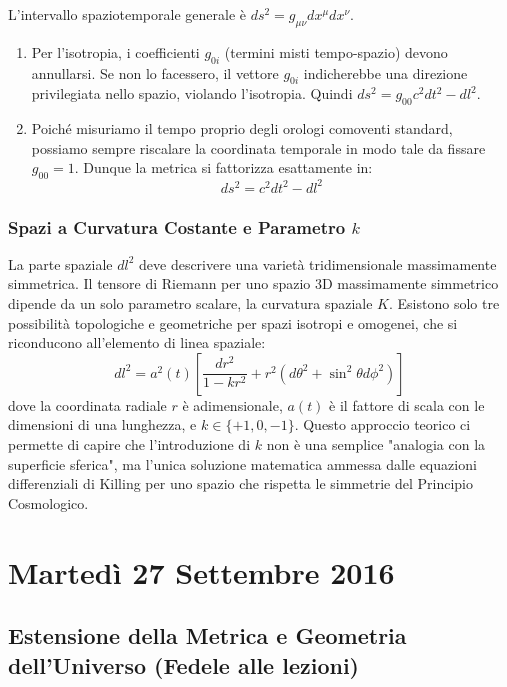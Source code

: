 \documentclass[11pt,a4paper]{report}
\begin{document}
L'intervallo spaziotemporale generale è $ds^2 = g_{\mu\nu} dx^\mu dx^\nu$. 
\begin{enumerate}
    \item Per l'isotropia, i coefficienti $g_{0i}$ (termini misti tempo-spazio) devono annullarsi. Se non lo facessero, il vettore $g_{0i}$ indicherebbe una direzione privilegiata nello spazio, violando l'isotropia. Quindi $ds^2 = g_{00} c^2 dt^2 - dl^2$.
    \item Poiché misuriamo il tempo proprio degli orologi comoventi standard, possiamo sempre riscalare la coordinata temporale in modo tale da fissare $g_{00} = 1$. Dunque la metrica si fattorizza esattamente in:
    \begin{equation}
        ds^2 = c^2 dt^2 - dl^2
    \end{equation}
\end{enumerate}

\subsection{Spazi a Curvatura Costante e Parametro $k$}
La parte spaziale $dl^2$ deve descrivere una varietà tridimensionale massimamente simmetrica. Il tensore di Riemann per uno spazio 3D massimamente simmetrico dipende da un solo parametro scalare, la curvatura spaziale $K$. 
Esistono solo tre possibilità topologiche e geometriche per spazi isotropi e omogenei, che si riconducono all'elemento di linea spaziale:
\begin{equation}
    dl^2 = a^2(t) \left[ \frac{dr^2}{1-kr^2} + r^2(d\theta^2 + \sin^2\theta d\phi^2) \right]
\end{equation}
dove la coordinata radiale $r$ è adimensionale, $a(t)$ è il fattore di scala con le dimensioni di una lunghezza, e $k \in \{+1, 0, -1\}$. 
Questo approccio teorico ci permette di capire che l'introduzione di $k$ non è una semplice "analogia con la superficie sferica", ma l'unica soluzione matematica ammessa dalle equazioni differenziali di Killing per uno spazio che rispetta le simmetrie del Principio Cosmologico.

\chapter{Martedì 27 Settembre 2016}

\section{Estensione della Metrica e Geometria dell'Universo (Fedele alle lezioni)}
\end{document}
